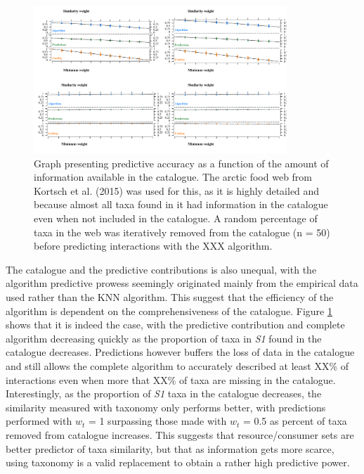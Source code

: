 \documentclass[letterpaper]{article}
\begin{document}
\begin{figure}[h]
  \centering\includegraphics[width=0.85\textwidth]{catalog_predictions2.pdf}
  \caption{Graph presenting predictive accuracy as a function of the amount of information available in the catalogue. The arctic food web from Kortsch et al. (2015) was used for this, as it is highly detailed and because almost all taxa found in it had information in the catalogue even when not included in the catalogue. A random percentage of taxa in the web was iteratively removed from the catalogue (n = 50) before predicting interactions with the XXX algorithm.}
  \label{fig:catalog_pred}
\end{figure}

The catalogue and the predictive contributions is also unequal, with the algorithm predictive prowess seemingly originated mainly from the empirical data used rather than the KNN algorithm. This suggest that the efficiency of the algorithm is dependent on the comprehensiveness of the catalogue. Figure \ref{fig:catalog_pred} shows that it is indeed the case, with the predictive contribution and complete algorithm decreasing quickly as the proportion of taxa in \textit{S1} found in the catalogue decreases. Predictions however buffers the loss of data in the catalogue and still allows the complete algorithm to accurately described at least XX\% of interactions even when more that XX\% of taxa are missing in the catalogue. Interestingly, as the proportion of \textit{S1} taxa in the catalogue decreases, the similarity measured with taxonomy only performs better, with predictions performed with $w_t$ = 1 surpassing those made with $w_t$ = 0.5 as percent of taxa removed from catalogue increases. This suggests that resource/consumer sets are better predictor of taxa similarity, but that as information gets more scarce, using taxonomy is a valid replacement to obtain a rather high predictive power.
\end{document}
